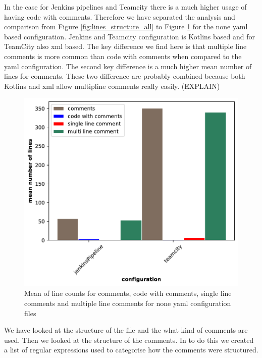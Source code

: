 \documentclass[twoside,12pt,titlepage,a4paper]{article}
\begin{document}
In the case for Jenkins pipelines and Teamcity there is a much higher usage of having code with comments. Therefore we have separated the analysis and comparison from Figure \ref{fig:lines_structure_all} to Figure \ref{fig:lines_structure_none_yaml} for the none yaml based configuration. Jenkins and Teamcity configuration is Kotlins based and for TeamCity also xml based. The key difference we find here is that multiple line comments is more common than code with comments when compared to the yaml configuration. The second key difference is a much higher mean number of lines for comments. These two difference are probably combined because both Kotlins and xml allow multipline comments really easily. (EXPLAIN)
\begin{figure}[!ht]
  \centering
  \includegraphics[width=\textwidth]{../src/results/line structure none yaml comments.pdf}
  \caption[alt text]{Mean of line counts for comments, code with comments, single line comments and multiple line comments for none yaml configuration files}
  \label{fig:lines_structure_none_yaml}
\end{figure}

We have looked at the structure of the file and the what kind of comments are used. Then we looked at the structure of the comments. In to do this we created a list of regular expressions used to categorise how the comments were structured. 
\end{document}
